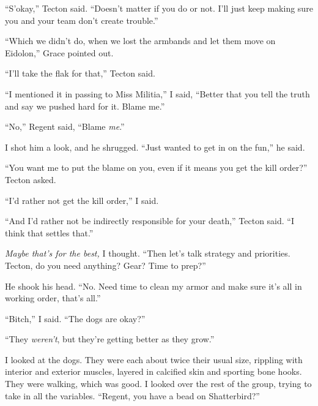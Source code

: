 ``S'okay,'' Tecton said.  ``Doesn't matter if you do or not.  I'll just keep making sure you and your team don't create trouble.''



``Which we didn't do, when we lost the armbands and let them move on Eidolon,'' Grace pointed out.



``I'll take the flak for that,'' Tecton said.



``I mentioned it in passing to Miss Militia,'' I said, ``Better that you tell the truth and say we pushed hard for it.  Blame me.''



``No,'' Regent said, ``Blame \emph{me}.''



I shot him a look, and he shrugged.  ``Just wanted to get in on the fun,'' he said.



``You want me to put the blame on you, even if it means you get the kill order?'' Tecton asked.



``I'd rather not get the kill order,'' I said.



``And I'd rather not be indirectly responsible for your death,'' Tecton said.  ``I think that settles that.''



\emph{Maybe that's for the best, }I thought.  ``Then let's talk strategy and priorities.  Tecton, do you need anything?  Gear?  Time to prep?''



He shook his head.  ``No.  Need time to clean my armor and make sure it's all in working order, that's all.''



``Bitch,'' I said.  ``The dogs are okay?''



``They \emph{weren't}, but they're getting better as they grow.''



I looked at the dogs.  They were each about twice their usual size, rippling with interior and exterior muscles, layered in calcified skin and sporting bone hooks.  They were walking, which was good.  I looked over the rest of the group, trying to take in all the variables.  ``Regent, you have a bead on Shatterbird?''



